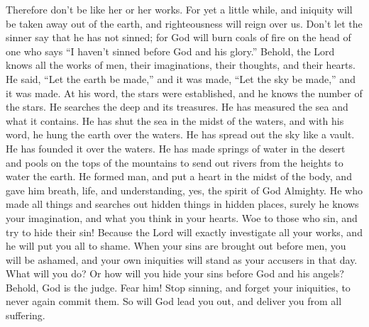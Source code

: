  Therefore don't be like her or her works. 
For yet a little while, and iniquity will be taken away out of the
earth, and righteousness will reign over us.  Don't let the
sinner say that he has not sinned; for God will burn coals of fire on
the head of one who says ``I haven't sinned before God and his glory.''
 Behold, the Lord knows all the works of men, their
imaginations, their thoughts, and their hearts.  He said,
``Let the earth be made,'' and it was made, ``Let the sky be made,'' and
it was made.  At his word, the stars were established, and
he knows the number of the stars.  He searches the deep and
its treasures. He has measured the sea and what it contains.
 He has shut the sea in the midst of the waters, and with
his word, he hung the earth over the waters.  He has spread
out the sky like a vault. He has founded it over the waters.
 He has made springs of water in the desert and pools on
the tops of the mountains to send out rivers from the heights to water
the earth.  He formed man, and put a heart in the midst of
the body, and gave him breath, life, and understanding, 
yes, the spirit of God Almighty. He who made all things and searches out
hidden things in hidden places,  surely he knows your
imagination, and what you think in your hearts. Woe to those who sin,
and try to hide their sin!  Because the Lord will exactly
investigate all your works, and he will put you all to shame.
 When your sins are brought out before men, you will be
ashamed, and your own iniquities will stand as your accusers in that
day.  What will you do? Or how will you hide your sins
before God and his angels?  Behold, God is the judge. Fear
him! Stop sinning, and forget your iniquities, to never again commit
them. So will God lead you out, and deliver you from all suffering.

